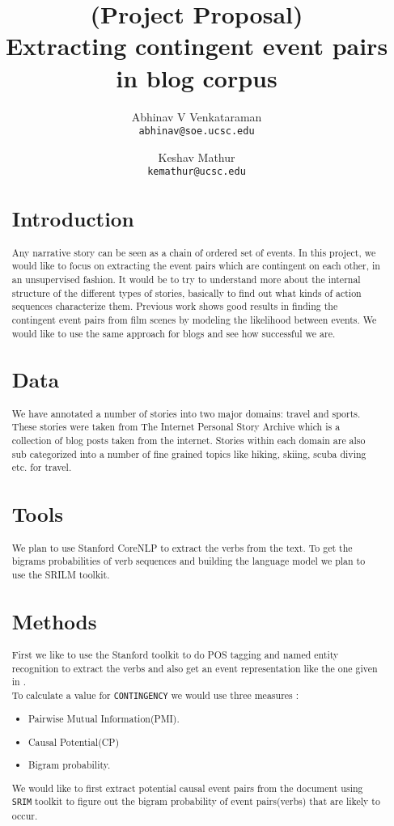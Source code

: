 \documentclass[10pt,english]{article}
\author{
  Abhinav V Venkataraman\\
  \texttt{abhinav@soe.ucsc.edu}
  \and
  Keshav Mathur\\
  \texttt{kemathur@ucsc.edu}
}
\title{ {(Project Proposal)} \\ \vspace{2 mm}Extracting contingent event pairs in  blog corpus}
\begin{document}
  \maketitle
 \begin{abstract}
 
 
 
 \section{Introduction}
  Any narrative story can be seen as a chain of ordered set of events. In this project, we would like to focus on extracting the event pairs which are contingent on each other, in an unsupervised fashion. It would be to try to understand more about the internal structure of the different types of stories, basically to find out what kinds of action sequences characterize them. Previous work shows good results in finding the contingent event pairs from film scenes by modeling the likelihood between events\cite{film}. We would like to use the same approach for blogs and see how successful we are.
  \section{Data}
 We have annotated a number of stories into two major domains: travel and sports. These stories were taken from The Internet Personal Story Archive\cite{ipsa} which is a collection of blog posts taken from the internet. Stories within each domain are also sub categorized into a number of fine grained topics like hiking, skiing, scuba diving etc. for travel. 

\section{Tools}
We plan to use Stanford CoreNLP\cite{corenlp} to extract the verbs from the text. To get the bigrams probabilities of verb sequences and building the language model we plan to use the SRILM toolkit\cite{srilm}.  

\section{Methods}
First we like to use the Stanford toolkit to do POS tagging and named entity recognition to extract the verbs and also get an event representation like the one given in \cite{film}. \\
To calculate a value for \texttt{CONTINGENCY} we would use three measures :
\begin{itemize}
\item Pairwise Mutual Information(PMI).
\item Causal Potential(CP)\cite{cp}
\item Bigram probability.
\end{itemize}
We would like to first extract potential causal event pairs from the document using \texttt{SRIM} toolkit to figure out the bigram probability of event pairs(verbs) that are likely to occur.  \\


\end{abstract}
\end{document}
